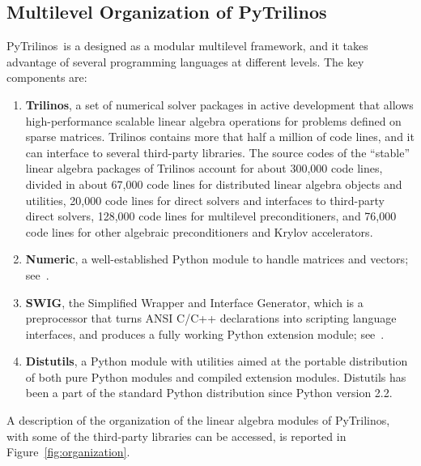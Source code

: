 \documentclass[acmtocl]{acmtrans2m}
\newcommand{\PyTrilinos}{{PyTrilinos}}
\begin{document}
\subsection{Multilevel Organization of PyTrilinos}
\label{sec:multilevel}

\PyTrilinos\ is a designed as a modular multilevel framework, and it
takes advantage of several programming languages at different levels.
The key components are:
\begin{enumerate}

\item {\bf Trilinos}, a set of numerical solver packages in active
  development that allows high-performance scalable linear algebra
  operations for problems defined on sparse matrices. Trilinos
  contains more that half a million of code lines, and it can
  interface to several third-party libraries. The source codes of the
  ``stable'' linear algebra packages of Trilinos account for about 300,000
  code lines, divided in about 67,000 code lines for distributed linear
  algebra objects and utilities, 20,000 code lines for direct solvers and
  interfaces to third-party direct solvers, 128,000 code lines for multilevel
  preconditioners, and 76,000 code lines for other algebraic preconditioners
  and Krylov accelerators.

\item {\bf Numeric}, a well-established Python module to handle
  matrices and vectors; see~\cite{numeric}.

\item {\bf SWIG}, the Simplified Wrapper and Interface Generator,
  which is a preprocessor that turns ANSI C/C++ declarations into
  scripting language interfaces, and produces a fully working Python
  extension module; see~\cite{swig}.

\item {\bf Distutils}, a Python module with utilities aimed at the
  portable distribution of both pure Python modules and compiled
  extension modules.  Distutils has been a part of the standard Python
  distribution since Python version 2.2.

\end{enumerate}

A description of the organization of  the linear algebra modules of
PyTrilinos, with some of the third-party libraries can be accessed,
is reported in Figure~\ref{fig:organization}.
\end{document}
